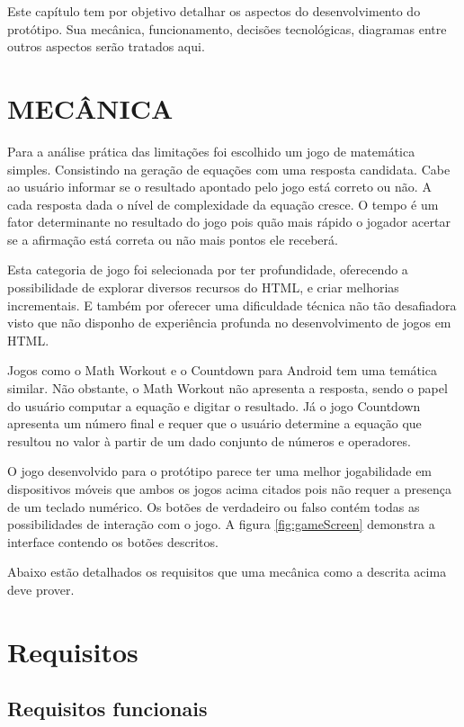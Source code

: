 Este capítulo tem por objetivo detalhar os aspectos do desenvolvimento
do protótipo. Sua mecânica, funcionamento, decisões tecnológicas,
diagramas entre outros aspectos serão tratados aqui.

\section{MECÂNICA}

Para a análise prática das limitações foi escolhido um jogo de
matemática simples. Consistindo na geração de equações com uma
resposta candidata. Cabe ao usuário informar se o resultado apontado
pelo jogo está correto ou não. A cada resposta dada o nível de
complexidade da equação cresce. O tempo é um fator determinante
no resultado do jogo pois quão mais rápido o jogador acertar se a
afirmação está correta ou não mais pontos ele receberá.

Esta categoria de jogo foi selecionada por ter profundidade, oferecendo
a possibilidade de explorar diversos recursos do HTML, e criar melhorias
incrementais. E também por oferecer uma dificuldade técnica não
tão desafiadora visto que não disponho de experiência profunda no
desenvolvimento de jogos em HTML.

Jogos como o Math Workout e o Countdown para Android tem uma temática
similar. Não obstante, o Math Workout não apresenta a resposta, sendo
o papel do usuário computar a equação e digitar o resultado. Já o jogo
Countdown apresenta um número final e requer que o usuário determine
a equação que resultou no valor à partir de um dado conjunto de
números e operadores.

O jogo desenvolvido para o protótipo parece ter uma melhor jogabilidade
em dispositivos móveis que ambos os jogos acima citados pois não
requer a presença de um teclado numérico. Os botões de verdadeiro
ou falso contém todas as possibilidades de interação com o jogo. A
figura \ref{fig:gameScreen} demonstra a interface contendo os botões descritos.

Abaixo estão detalhados os requisitos que uma mecânica como a descrita
acima deve prover.

\section{Requisitos}

\subsection{Requisitos funcionais}

